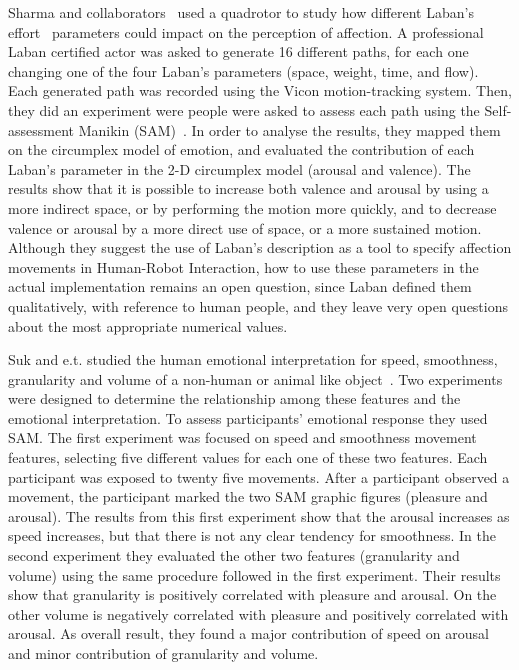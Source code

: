 Sharma and collaborators~\cite{Sharma2013} used a quadrotor to study how different Laban's effort~\cite{Laban1968} parameters could impact on the perception of affection. A professional Laban certified actor was asked to generate 16 different paths, for each one changing one of the four Laban's parameters (space, weight, time, and flow). Each generated path was recorded using the Vicon motion-tracking system. Then, they did an experiment were people were asked to assess each path using the Self-assessment Manikin (SAM)~\cite{Lang2008}. In order to analyse the results, they mapped them on the circumplex model of emotion, and evaluated the contribution of each Laban's parameter in the 2-D circumplex model (arousal and valence). The results show that it is possible to increase both valence and arousal by using a more indirect space, or by performing the motion more quickly, and to decrease valence or arousal by a more direct use of space, or a more sustained motion. Although they suggest the use of Laban's description as a tool to specify affection movements in Human-Robot Interaction, how to use these parameters in the actual implementation remains an open question, since Laban defined them qualitatively, with reference to human people, and they leave very open questions about the most appropriate numerical values.

Suk and e.t. studied the human emotional interpretation for speed, smoothness, granularity and volume of a non-human or animal like object~\cite{NAM2014}. Two experiments were designed to determine the relationship among these features and the emotional interpretation. To assess participants' emotional response they used SAM. The first experiment was focused on speed and smoothness movement features, selecting five different values for each one of these two features. Each participant was exposed to twenty five movements. After a participant observed a movement, the participant marked the two SAM graphic figures (pleasure and arousal).
The results from this first experiment show that the arousal increases as speed increases, but that there is not any clear tendency for smoothness. In the second experiment they evaluated the other two features (granularity and volume) using the same procedure followed in the first experiment. Their results show that granularity is positively correlated with pleasure and arousal. On the other volume is negatively correlated with pleasure and positively correlated with arousal. As overall result, they found a major contribution of speed on arousal and minor contribution of granularity and volume.


